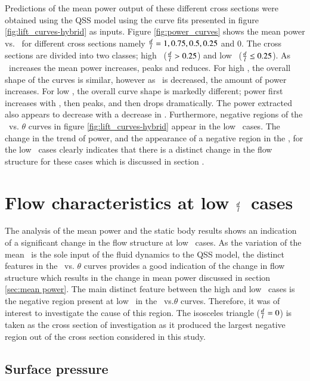Predictions of the mean power output of these different cross sections were obtained using the QSS model using the curve fits presented in figure \ref{fig:lift_curves-hybrid} as inputs. Figure \ref{fig:power_curves} shows the mean power vs. \massdamp\ for different cross sections namely $\frac{d}{l}=1,0.75,0.5,0.25$ and $0$. The cross sections are divided into two classes; high \ratio \ ($\frac{d}{l} > 0.25$) and low \ratio \ ($\frac{d}{l} \leq 0.25$). As \massdamp\ increases the mean power increases, peaks and reduces. For high \ratio, the overall shape of the curves is similar, however as \ratio\ is decreased, the amount of power increases. For low \ratio, the overall curve shape is markedly different; power first increases with \massdamp, then peaks, and then drops dramatically. The power extracted also appears to decrease with a decrease in \ratio. Furthermore, negative regions of the \cy\ vs. $\theta$ curves in figure \ref{fig:lift_curves-hybrid} appear in the low \ratio\ cases. The change in the trend of power, and the appearance of a negative region in the \cy, for the low \ratio\ cases clearly indicates that there is a distinct change in the flow structure for these cases which is discussed in section \label{sec:negative-region}.
 
\section{Flow characteristics at low $\frac{d}{l}$\ cases} 

The analysis of the mean power and the static body results shows an indication of a significant change in the flow structure at  low \ratio\ cases. As the variation of the mean \cy\ is the sole input of the fluid dynamics to the QSS model, the distinct features in the \cy\ vs. $\theta$ curves provides a good indication of the change in flow structure which results in the change in mean power discussed in section \ref{sec:mean power}. The main distinct feature between the high and low \ratio\ cases is the negative region present at low \ratio\ in the \cy\ vs.$\theta$ curves. Therefore, it was of interest to investigate the cause of this region. The isosceles triangle ($\frac{d}{l}=0$) is taken as the cross section of investigation as it produced the largest negative region out of the cross section considered in this study.  


\subsection{Surface pressure}
\label{subsec:surface-pressure}

